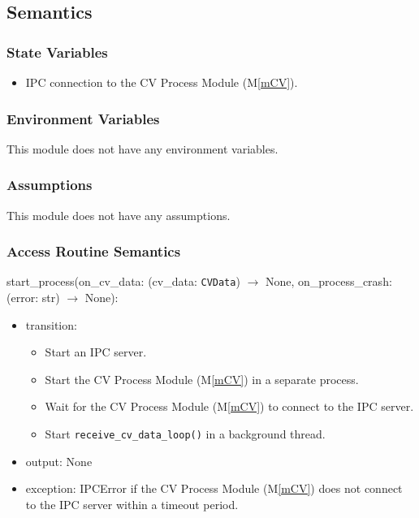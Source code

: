 \documentclass[12pt, titlepage]{article}
\newcommand{\mref}[1]{M\ref{#1}}
\begin{document}
\subsection{Semantics}

\subsubsection{State Variables}

\begin{itemize}
  \item IPC connection to the CV Process Module (\mref{mCV}).
\end{itemize}

\subsubsection{Environment Variables}

This module does not have any environment variables.

\subsubsection{Assumptions}

This module does not have any assumptions.

\subsubsection{Access Routine Semantics}

\noindent start\_process(on\_cv\_data: (cv\_data: \texttt{CVData}) $\rightarrow$ None, on\_process\_crash: (error: str) $\rightarrow$ None):
\begin{itemize}
  \item transition:
        \begin{itemize}
          \item Start an IPC server.
          \item Start the CV Process Module (\mref{mCV}) in a separate process.
          \item Wait for the CV Process Module (\mref{mCV}) to connect to the IPC server.
          \item Start \texttt{receive\_cv\_data\_loop()} in a background thread.
        \end{itemize}
  \item output: None
  \item exception: IPCError if the CV Process Module (\mref{mCV}) does not connect to
        the IPC server within a timeout period.
\end{itemize}
\end{document}
